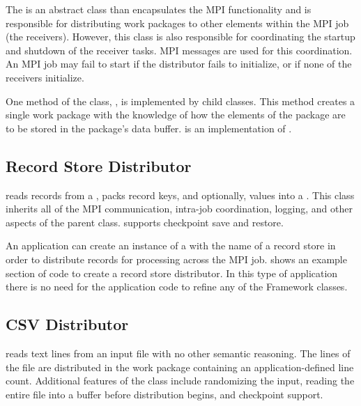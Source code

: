 The  is an abstract class than encapsulates the MPI
functionality and is responsible for distributing work packages to other
elements within the MPI job (the receivers). However, this class
is also responsible for coordinating the startup and shutdown of the receiver
tasks. MPI messages are used for this coordination. An MPI job may fail to
start if the distributor fails to initialize, or if none of the receivers
initialize.

One method of the  class, ,
is implemented by child classes. This method creates a single work package
with the knowledge of how the elements of the package are to be stored
in the package's data buffer.  is an
implementation of .

\subsection{Record Store Distributor}
\label{sec-recordstoredistributor}

 reads records from a ,
packs record keys, and optionally, values into a . This
class inherits all of the MPI communication, intra-job coordination, logging,
and other aspects of the  parent class.
 supports checkpoint save and restore.

An application can create an instance of a 
with the name of a record store in order to distribute records for
processing across the MPI job.  shows an
example section of code to create a record store distributor. In this
type of application there is no need for the application code to refine
any of the Framework classes.


\subsection{CSV Distributor}
\label{sec-recordstoredistributor}

 reads text lines from an input file with no other
semantic reasoning. The lines of the file are distributed in the work package
containing an application-defined line count. Additional features of the
 class include randomizing the input, reading the entire
file into a buffer before distribution begins, and checkpoint support.

